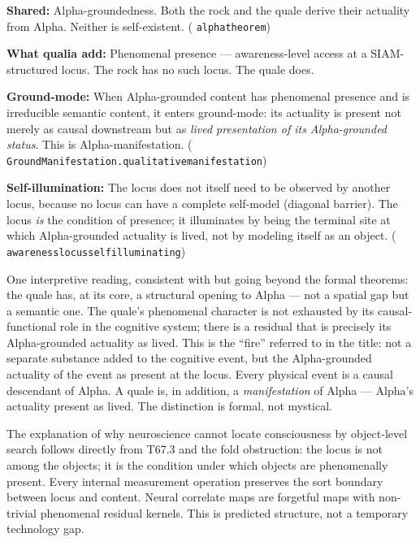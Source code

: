 \documentclass[11pt]{article}
\theoremstyle{remark}
\newcommand{\lean}[1]{%
  \penalty-100
  \begingroup\def\_{\textunderscore\allowbreak}\texttt{#1}\endgroup}
\begin{document}
\begin{tcolorbox}[colback=gray!14,colframe=gray!50!black,
  title={Formal summary: why rocks are Alpha-grounded but not conscious}]
\textbf{Shared:} Alpha-groundedness. Both the rock and the quale derive their
actuality from Alpha. Neither is self-existent. (\lean{alpha\_theorem})

\medskip
\textbf{What qualia add:} Phenomenal presence --- awareness-level access at a
SIAM-structured locus. The rock has no such locus. The quale does.

\medskip
\textbf{Ground-mode:} When Alpha-grounded content has phenomenal presence and is
irreducible semantic content, it enters ground-mode: its actuality is present not
merely as causal downstream but as \emph{lived presentation of its Alpha-grounded
status}. This is Alpha-manifestation.
(\lean{GroundManifestation.qualitative\_manifestation})

\medskip
\textbf{Self-illumination:} The locus does not itself need to be observed by another
locus, because no locus can have a complete self-model (diagonal barrier). The locus
\emph{is} the condition of presence; it illuminates by being the terminal site at
which Alpha-grounded actuality is lived, not by modeling itself as an object.
(\lean{awareness\_locus\allowbreak\_self\_illuminating})
\end{tcolorbox}

One interpretive reading, consistent with but going beyond the formal theorems:
the quale has, at its core, a structural opening to Alpha --- not a spatial gap but a
semantic one. The quale's phenomenal character is not exhausted by its causal-functional
role in the cognitive system; there is a residual that is precisely its Alpha-grounded
actuality as lived. This is the ``fire'' referred to in the title: not a separate
substance added to the cognitive event, but the Alpha-grounded actuality of the event
as present at the locus. Every physical event is a causal descendant of Alpha. A quale
is, in addition, a \emph{manifestation} of Alpha --- Alpha's actuality present as lived.
The distinction is formal, not mystical.

\medskip
The explanation of why neuroscience cannot locate consciousness by object-level search
follows directly from T67.3 and the fold obstruction: the locus is not among the
objects; it is the condition under which objects are phenomenally present. Every
internal measurement operation preserves the sort boundary between locus and content.
Neural correlate maps are forgetful maps with non-trivial phenomenal residual kernels.
This is predicted structure, not a temporary technology gap.
\end{document}
